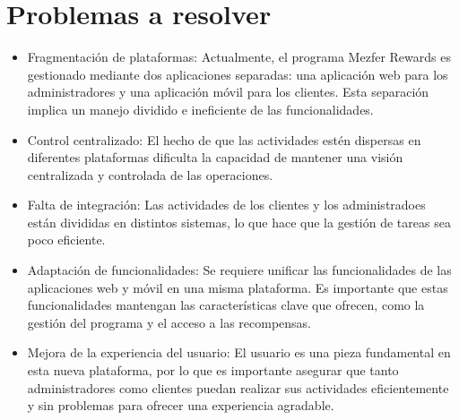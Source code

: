 \chapter{Problemas a resolver}
    \begin{itemize}
        \item Fragmentación de plataformas: Actualmente, el programa Mezfer Rewards es gestionado mediante dos aplicaciones separadas: una aplicación web para los administradores y una aplicación móvil para los clientes. Esta separación implica un manejo dividido e ineficiente de las funcionalidades.
        \item Control centralizado: El hecho de que las actividades estén dispersas en diferentes plataformas dificulta la capacidad de mantener una visión centralizada y controlada de las operaciones.
        \item Falta de integración: Las actividades de los clientes y los administradoes están divididas en distintos sistemas, lo que hace que la gestión de tareas sea poco eficiente.
        \item Adaptación de funcionalidades: Se requiere unificar las funcionalidades de las aplicaciones web y móvil en una misma plataforma. Es importante que estas funcionalidades mantengan las características clave que ofrecen, como la gestión del programa y el acceso a las recompensas.
        \item Mejora de la experiencia del usuario: El usuario es una pieza fundamental en esta nueva plataforma, por lo que es importante asegurar que tanto administradores como clientes puedan realizar sus actividades eficientemente y sin problemas para ofrecer una experiencia agradable.    
    \end{itemize}